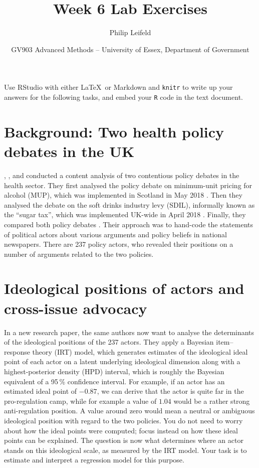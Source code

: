 \documentclass[a4paper,11pt]{article}
\title{Week 6 Lab Exercises}
\author{Philip Leifeld}
\date{GV903 Advanced Methods -- University of Essex, Department of Government}
\begin{document}
\maketitle

\noindent Use RStudio with either \LaTeX\ or Markdown and \texttt{knitr} to write up your answers for the following tasks, and embed your \texttt{R} code in the text document.

\section*{Background: Two health policy debates in the UK}
\citet{fergie2019mapping}, \citet{buckton2019discourse}, and \citet{hilton2020policy} conducted a content analysis of two contentious policy debates in the health sector. They first analysed the policy debate on minimum-unit pricing for alcohol (MUP), which was implemented in Scotland in May 2018 \citep{fergie2019mapping}. Then they analysed the debate on the soft drinks industry levy (SDIL), informally known as the ``sugar tax'', which was implemented UK-wide in April 2018 \citep{buckton2019discourse}. Finally, they compared both policy debates \citep{hilton2020policy}. Their approach was to hand-code the statements of political actors about various arguments and policy beliefs in national newspapers. There are 237 policy actors, who revealed their positions on a number of arguments related to the two policies.

\section*{Ideological positions of actors and cross-issue advocacy}
In a new research paper, the same authors now want to analyse the determinants of the ideological positions of the 237 actors. They apply a Bayesian item--response theory (IRT) model, which generates estimates of the ideological ideal point of each actor on a latent underlying ideological dimension along with a highest-posterior density (HPD) interval, which is roughly the Bayesian equivalent of a 95\,\% confidence interval. For example, if an actor has an estimated ideal point of $-0.87$, we can derive that the actor is quite far in the pro-regulation camp, while for example a value of $1.04$ would be a rather strong anti-regulation position. A value around zero would mean a neutral or ambiguous ideological position with regard to the two policies. You do not need to worry about how the ideal points were computed; focus instead on how these ideal points can be explained. The question is now what determines where an actor stands on this ideological scale, as measured by the IRT model. Your task is to estimate and interpret a regression model for this purpose.
\end{document}
